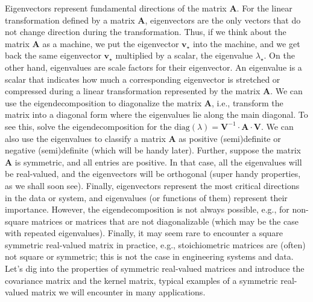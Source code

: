 \documentclass{article}[11pt]
\begin{document}
Eigenvectors represent fundamental directions of the matrix $\mathbf{A}$. For the linear transformation defined by a matrix $\mathbf{A}$, eigenvectors are the only vectors that do not change direction during the transformation. 
Thus, if we think about the matrix $\mathbf{A}$ as a machine, we put the eigenvector $\mathbf{v}_{\star}$ into the machine, and we get back the same eigenvector $\mathbf{v}_{\star}$ multiplied by a scalar, the eigenvalue $\lambda_{\star}$.
On the other hand, eigenvalues are scale factors for their eigenvector. An eigenvalue is a scalar that indicates how much a corresponding eigenvector is stretched or compressed during a linear transformation represented by the matrix $\mathbf{A}$.
We can use the eigendecomposition to diagonalize the matrix $\mathbf{A}$, i.e., transform the matrix into a diagonal form where the eigenvalues lie along the main diagonal. To see this, solve the eigendecomposition for the $\text{diag}(\lambda) = \mathbf{V}^{-1}\cdot\mathbf{A}\cdot\mathbf{V}$. 
We can also use the eigenvalues to classify a matrix $\mathbf{A}$ as positive (semi)definite or negative (semi)definite (which will be handy later). 
Further, suppose the matrix $\mathbf{A}$ is symmetric, and all entries are positive. In that case, all the eigenvalues will be real-valued, and the eigenvectors will be orthogonal (super handy properties, as we shall soon see).
Finally, eigenvectors represent the most critical directions in the data or system, and eigenvalues (or functions of them) represent their importance. However, the eigendecomposition is not always possible, e.g., for non-square matrices or matrices that are not diagonalizable (which may be the case with repeated eigenvalues). Finally, it may seem rare to encounter a square symmetric real-valued matrix in practice, e.g., stoichiometric matrices are (often) not square or symmetric; this is not the case in engineering systems and data. Let's dig into the properties of symmetric real-valued matrices and introduce the covariance matrix and the kernel matrix, typical examples of a symmetric real-valued matrix we will encounter in many applications.
\end{document}
